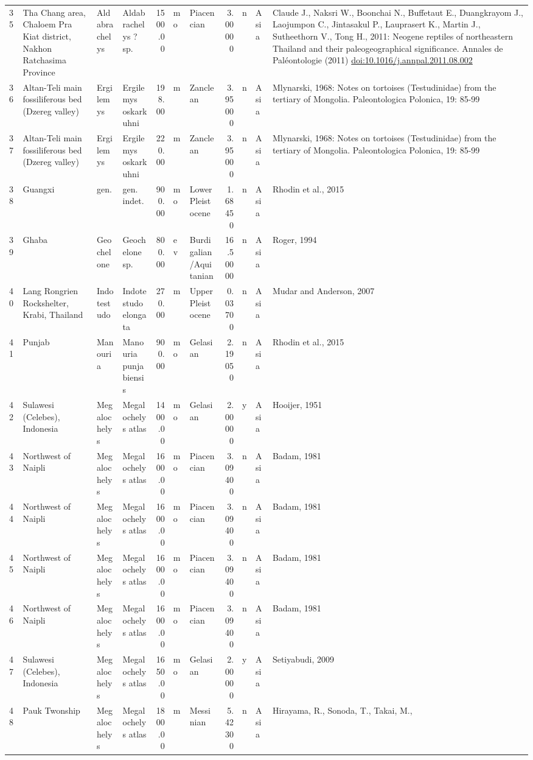 \begin{landscape}
{\begin{longtable}[]{@{}llllrllrlll@{}}
	35 & Tha Chang area, Chaloem Pra Kiat district, Nakhon Ratchasima
	Province & Aldabrachelys & Aldabrachelys ? sp. & 1500.00 & mo &
	Piacencian & 3.00000 & n & Asia & Claude J., Naksri W., Boonchai N.,
	Buffetaut E., Duangkrayom J., Laojumpon C., Jintasakul P., Lauprasert
	K., Martin J., Sutheethorn V., Tong H., 2011: Neogene reptiles of
	northeastern Thailand and their paleogeographical significance. Annales
	de Paléontologie (2011)
	\url{doi:10.1016/j.annpal.2011.08.002}\tabularnewline
	36 & Altan-Teli main fossiliferous bed (Dzereg valley) & Ergilemys &
	Ergilemys oskarkuhni & 198.00 & m & Zanclean & 3.95000 & n & Asia &
	Mlynarski, 1968: Notes on tortoises (Testudinidae) from the tertiary of
	Mongolia. Paleontologica Polonica, 19: 85-99\tabularnewline
	37 & Altan-Teli main fossiliferous bed (Dzereg valley) & Ergilemys &
	Ergilemys oskarkuhni & 220.00 & m & Zanclean & 3.95000 & n & Asia &
	Mlynarski, 1968: Notes on tortoises (Testudinidae) from the tertiary of
	Mongolia. Paleontologica Polonica, 19: 85-99\tabularnewline
	38 & Guangxi & gen. & gen. indet. & 900.00 & mo & Lower Pleistocene &
	1.68450 & n & Asia & Rhodin et al., 2015\tabularnewline
	39 & Ghaba & Geochelone & Geochelone sp. & 800.00 & ev &
	Burdigalian/Aquitanian & 16.50000 & n & Asia & Roger,
	1994\tabularnewline
	40 & Lang Rongrien Rockshelter, Krabi, Thailand & Indotestudo &
	Indotestudo elongata & 270.00 & m & Upper Pleistocene & 0.03700 & n &
	Asia & Mudar and Anderson, 2007\tabularnewline
	41 & Punjab & Manouria & Manouria punjabiensis & 900.00 & mo & Gelasian
	& 2.19050 & n & Asia & Rhodin et al., 2015\tabularnewline
	42 & Sulawesi (Celebes), Indonesia & Megalochelys & Megalochelys atlas &
	1400.00 & mo & Gelasian & 2.00000 & y & Asia & Hooijer,
	1951\tabularnewline
	43 & Northwest of Naipli & Megalochelys & Megalochelys atlas & 1600.00 &
	mo & Piacencian & 3.09400 & n & Asia & Badam, 1981\tabularnewline
	44 & Northwest of Naipli & Megalochelys & Megalochelys atlas & 1600.00 &
	mo & Piacencian & 3.09400 & n & Asia & Badam, 1981\tabularnewline
	45 & Northwest of Naipli & Megalochelys & Megalochelys atlas & 1600.00 &
	mo & Piacencian & 3.09400 & n & Asia & Badam, 1981\tabularnewline
	46 & Northwest of Naipli & Megalochelys & Megalochelys atlas & 1600.00 &
	mo & Piacencian & 3.09400 & n & Asia & Badam, 1981\tabularnewline
	47 & Sulawesi (Celebes), Indonesia & Megalochelys & Megalochelys atlas &
	1650.00 & mo & Gelasian & 2.00000 & y & Asia & Setiyabudi,
	2009\tabularnewline
	48 & Pauk Twonship & Megalochelys & Megalochelys atlas & 1800.00 & m &
	Messinian & 5.42300 & n & Asia & Hirayama, R., Sonoda, T., Takai, M.,

\end{longtable}}
\end{landscape}
